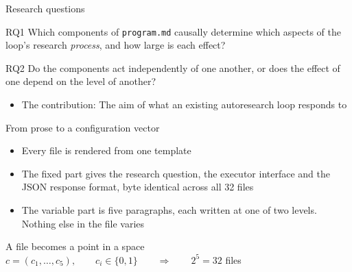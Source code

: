 \documentclass[aspectratio=169,11pt]{beamer}
\newcommand{\prog}{\texttt{program.md}}
\begin{document}

\begin{frame}{Research questions}
  \begin{block}{RQ1}
    Which components of \texttt{\prog} causally determine which aspects of the
    loop's research \emph{process}, and how large is each effect?
  \end{block}
  \vfill
  \begin{block}{RQ2}
    Do the components act independently of one another, or does the effect of
    one depend on the level of another?
  \end{block}
  \vfill
  \begin{itemize}
    \item The contribution: The aim of what an existing autoresearch loop responds to

  \end{itemize}
\end{frame}


\begin{frame}{From prose to a configuration vector}
  \begin{itemize}
    \item Every file is rendered from one template
    \item The fixed part gives the research question, the executor interface
          and the JSON response format, byte identical across all 32 files
    \item The variable part is five paragraphs, each written at one of two
          levels. Nothing else in the file varies
  \end{itemize}
  \vfill
  \begin{block}{A file becomes a point in a space}
    \centering
    $c = (c_1,\ldots,c_5), \qquad c_i \in \{0,1\}
     \qquad\Longrightarrow\qquad 2^5 = 32$ files
  \end{block}
\end{frame}
\end{document}
